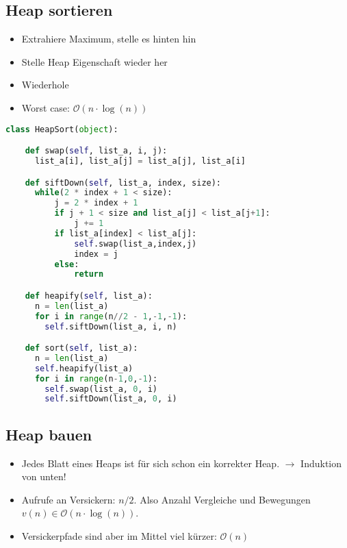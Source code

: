 \documentclass[german]{latex4ei/latex4ei_sheet}
\begin{document}
\begin{sectionbox}
\subsection{Heap sortieren}\smallskip
\begin{itemize}
    \item Extrahiere Maximum, stelle es hinten hin
    \item Stelle Heap Eigenschaft wieder her
    \item Wiederhole
    \item Worst case: $\mathcal{O}(n \cdot \operatorname{log}(n))$
\end{itemize}

\begin{lstlisting}[language=Python]
class HeapSort(object):

    def swap(self, list_a, i, j):
      list_a[i], list_a[j] = list_a[j], list_a[i]

    def siftDown(self, list_a, index, size):
      while(2 * index + 1 < size):
          j = 2 * index + 1
          if j + 1 < size and list_a[j] < list_a[j+1]:
              j += 1
          if list_a[index] < list_a[j]:
              self.swap(list_a,index,j)
              index = j
          else:
              return

    def heapify(self, list_a):
      n = len(list_a)
      for i in range(n//2 - 1,-1,-1):
        self.siftDown(list_a, i, n)

    def sort(self, list_a):
      n = len(list_a)
      self.heapify(list_a)
      for i in range(n-1,0,-1):
        self.swap(list_a, 0, i)
        self.siftDown(list_a, 0, i)
\end{lstlisting}\vspace{-4px}
\end{sectionbox}

\begin{sectionbox}
\subsection{Heap bauen}\smallskip
\begin{itemize}
    \item Jedes Blatt eines Heaps ist für sich schon ein korrekter Heap. $\rightarrow$ Induktion von unten!
    \item Aufrufe an Versickern: $n/2$. Also Anzahl Vergleiche und Bewegungen $v(n) \in \mathcal{O}(n \cdot \operatorname{log}(n))$.
    \item Versickerpfade sind aber im Mittel viel kürzer: $\mathcal{O}(n)$
\end{itemize}
\end{sectionbox}
\end{document}
